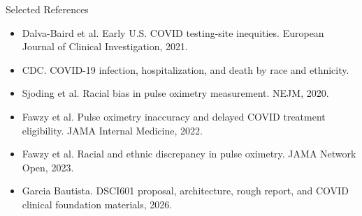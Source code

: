 \begin{frame}{Selected References}
\scriptsize
\begin{itemize}
\item Dalva-Baird et al. Early U.S. COVID testing-site inequities. European Journal of Clinical Investigation, 2021.
\item CDC. COVID-19 infection, hospitalization, and death by race and ethnicity.
\item Sjoding et al. Racial bias in pulse oximetry measurement. NEJM, 2020.
\item Fawzy et al. Pulse oximetry inaccuracy and delayed COVID treatment eligibility. JAMA Internal Medicine, 2022.
\item Fawzy et al. Racial and ethnic discrepancy in pulse oximetry. JAMA Network Open, 2023.
\item Garcia Bautista. DSCI601 proposal, architecture, rough report, and COVID clinical foundation materials, 2026.
\end{itemize}
\end{frame}
